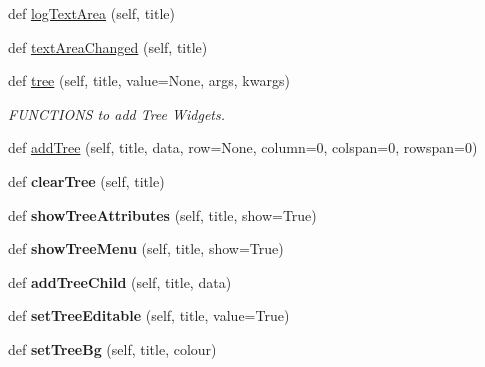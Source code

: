 \begin{DoxyCompactItemize}
\item 
def \hyperlink{class_python_01_g_u_i_1_1appjar_1_1gui_abe244b3c22292dfa85da8b28d73acbab}{log\+Text\+Area} (self, title)
\item 
def \hyperlink{class_python_01_g_u_i_1_1appjar_1_1gui_ae873f81d7aa826f80b1fcfba3f7110a5}{text\+Area\+Changed} (self, title)
\item 
def \hyperlink{class_python_01_g_u_i_1_1appjar_1_1gui_a7e54f636e5049ad8c55309dfb05303ee}{tree} (self, title, value=None, args, kwargs)
\begin{DoxyCompactList}\small\item\em F\+U\+N\+C\+T\+I\+O\+NS to add Tree Widgets. \end{DoxyCompactList}\item 
def \hyperlink{class_python_01_g_u_i_1_1appjar_1_1gui_a7c96e030cc769c3db0be0162f15dc3c8}{add\+Tree} (self, title, data, row=None, column=0, colspan=0, rowspan=0)
\item 
\mbox{\label{class_python_01_g_u_i_1_1appjar_1_1gui_a57f7f42bdaf4cff04bddae710ff566c0}} 
def {\bfseries clear\+Tree} (self, title)
\item 
\mbox{\label{class_python_01_g_u_i_1_1appjar_1_1gui_a825b5da01f761ca5e15cc125e046a165}} 
def {\bfseries show\+Tree\+Attributes} (self, title, show=True)
\item 
\mbox{\label{class_python_01_g_u_i_1_1appjar_1_1gui_a927ef4d7aa0dc3fdcbef5c36bde58a74}} 
def {\bfseries show\+Tree\+Menu} (self, title, show=True)
\item 
\mbox{\label{class_python_01_g_u_i_1_1appjar_1_1gui_a8c300f308d26dd04adcee560c80f5af4}} 
def {\bfseries add\+Tree\+Child} (self, title, data)
\item 
\mbox{\label{class_python_01_g_u_i_1_1appjar_1_1gui_a8d46da3b33adf54bfd1dec664e5fca60}} 
def {\bfseries set\+Tree\+Editable} (self, title, value=True)
\item 
\mbox{\label{class_python_01_g_u_i_1_1appjar_1_1gui_a8bcd42f02710fbd8af9474ff3afc351c}} 
def {\bfseries set\+Tree\+Bg} (self, title, colour)

\end{DoxyCompactItemize}
